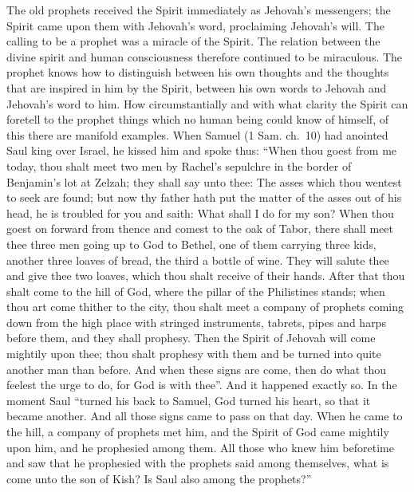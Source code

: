 \documentclass[12pt,a4paper,openany]{book}
\newcommand{\opage}[1]{\marginnote{\footnotesize\textit{[#1]}}}
\begin{document}
The old prophets received the Spirit immediately
as Jehovah's messengers; the Spirit came upon them with
Jehovah's word, proclaiming Jehovah's will. The calling
to be a prophet was a miracle of the Spirit. The relation between
the divine spirit and human consciousness
therefore continued to be miraculous. The prophet
knows how to distinguish between his own thoughts and the thoughts
that are inspired in him by the Spirit, between his own words to
Jehovah and Jehovah's word to him. How circumstantially
and with what clarity the Spirit can foretell to the
\setcounter{footnote}{0}%
\opage{9}prophet things which no human being could know of himself,
of this there are manifold examples. When Samuel (1 Sam.
ch.\ 10) had anointed Saul king over Israel, he kissed
him and spoke thus: ``When thou goest from
me today, thou shalt meet two men by Rachel's sepulchre in
the border of Benjamin's lot at Zelzah; they shall say
unto thee: The asses which thou wentest to seek are
found; but now thy father hath put the matter of
the asses out of his head, he is troubled for you and
saith: What shall I do for my son? When thou goest
on forward from thence and comest to the oak of Tabor,
there shall meet thee three men going up to
God to Bethel, one of them carrying three kids,
another three loaves of bread, the third a bottle of wine. They
will salute thee and give thee two loaves, which thou shalt
receive of their hands. After that thou shalt come
to the hill of God, where the pillar of the Philistines stands; when thou
art come thither to the city, thou shalt meet a company of prophets
coming down from the high place with stringed instruments,
tabrets, pipes and harps before them, and they shall prophesy.
Then the Spirit of Jehovah will come mightily upon thee; thou shalt
prophesy with them and be turned into quite another
man than before. And when these signs are come, then
do what thou feelest the urge to do, for God is with thee''.
And it happened exactly so. In the moment Saul
``turned his back to Samuel, God turned his heart, so that
it became another. And all those signs came to pass on
that day. When he came to the hill, a company of prophets
met him, and the Spirit of God came mightily upon him,
and he prophesied among them. All those who
knew him beforetime and saw that he prophesied
with the prophets said
\setcounter{footnote}{0}%
\opage{10}among themselves, what is come unto the son of Kish? Is Saul also
among the prophets?''
\end{document}
